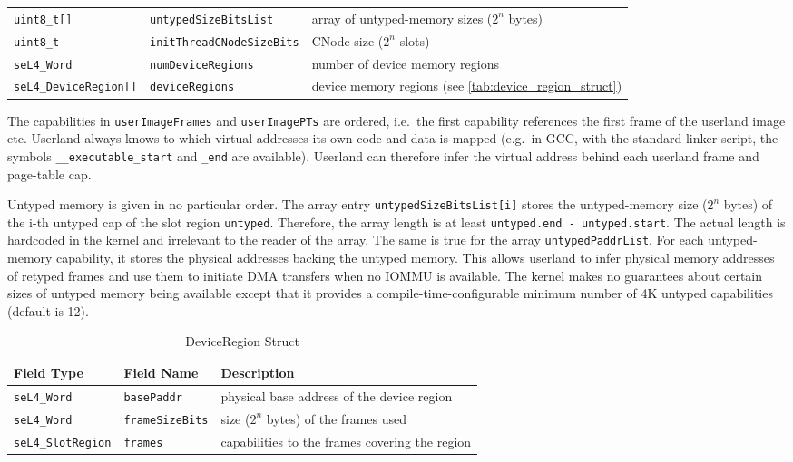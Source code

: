 \begin{table}[htb]
\begin{center}
\begin{tabularx}{\textwidth}{llX}
      \texttt{uint8\_t[]}           & \texttt{untypedSizeBitsList}     & array of untyped-memory sizes ($2^n$ bytes) \\
      \texttt{uint8\_t}             & \texttt{initThreadCNodeSizeBits} & CNode size ($2^n$ slots) \\
      \texttt{seL4\_Word}           & \texttt{numDeviceRegions}        & number of device memory regions \\
      \texttt{seL4\_DeviceRegion[]} & \texttt{deviceRegions}           & device memory regions (see \autoref{tab:device_region_struct}) \\
      \bottomrule
    \end{tabularx}
  \end{center}
\end{table}

The capabilities in \texttt{userImageFrames} and \texttt{userImagePTs} are
ordered, i.e.\ the first capability references the first frame of the
userland image etc. Userland always knows to which virtual addresses its own
code and data is mapped (e.g.\ in GCC, with the standard linker script, the
symbols \texttt{\_\_executable\_start} and \texttt{\_end} are available).
Userland can therefore
infer the virtual address behind each userland frame and page-table cap.

Untyped memory is given in no particular order. The array entry
\texttt{untypedSizeBitsList[i]} stores the untyped-memory size ($2^n$ bytes) of
the i-th untyped cap of the slot region \texttt{untyped}. Therefore, the array
length is at least \texttt{untyped.end - untyped.start}. The actual length is
hardcoded in the kernel and irrelevant to the reader of the array.
The same is true for the array \texttt{untypedPaddrList}. For each
untyped-memory capability, it stores the physical addresses backing the
untyped memory. This allows
userland to infer physical memory addresses of retyped frames and use them to
initiate DMA transfers when no IOMMU is available. The kernel makes no
guarantees about certain sizes of untyped memory being available except that it
provides a compile-time-configurable minimum number of 4K untyped capabilities
(default is 12).

\begin{table}[htb]
  \begin{center}
    \caption{DeviceRegion Struct}
    \label{tab:device_region_struct}
    \begin{tabular}{lll}
      \toprule
      Field Type & Field Name & Description \\
      \midrule
      \texttt{seL4\_Word}       & \texttt{basePaddr}     & physical base address of the device region \\
      \texttt{seL4\_Word}       & \texttt{frameSizeBits} & size ($2^n$ bytes) of the frames used \\
      \texttt{seL4\_SlotRegion} & \texttt{frames}        & capabilities to the frames covering the region \\
      \bottomrule
    \end{tabular}
  \end{center}
\end{table}

